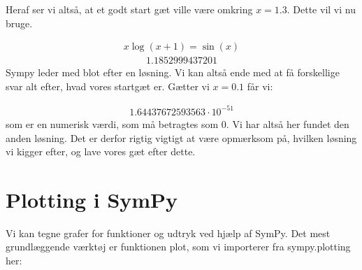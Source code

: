 \documentclass[letterpaper,10pt,english]{jupyterBook}
\begin{document}
Heraf ser vi altså, at et godt start gæt ville være omkring \(x=1.3\). Dette vil vi nu bruge.

\begin{sphinxVerbatim}[commandchars=\\\{\}]
       
  
\end{sphinxVerbatim}
\begin{equation*}
\begin{split}\displaystyle x \log{\left(x + 1 \right)} = \sin{\left(x \right)}\end{split}
\end{equation*}\begin{equation*}
\begin{split}\displaystyle 1.1852999437201\end{split}
\end{equation*}
Sympy leder med  blot efter en løsning. Vi kan altså ende med at få forskellige svar alt efter, hvad vores startgæt er. Gætter vi \(x = 0.1\) får vi:

\begin{sphinxVerbatim}[commandchars=\\\{\}]
  
\end{sphinxVerbatim}
\begin{equation*}
\begin{split}\displaystyle 1.64437672593563 \cdot 10^{-51}\end{split}
\end{equation*}
som er en numerisk værdi, som må betragtes som 0. Vi har altså her fundet den anden løsning. Det er derfor rigtig vigtigt at være opmærksom på, hvilken løsning vi kigger efter, og lave vores gæt efter dette.


\section{Plotting i SymPy}
\label{\detokenize{notebooks/sympy/Notebook3_plot:plotting-i-sympy}}\label{\detokenize{notebooks/sympy/Notebook3_plot::doc}}
Vi kan tegne grafer for funktioner og udtryk ved hjælp af SymPy. Det mest grundlæggende værktøj er funktionen plot, som vi importerer fra sympy.plotting her:
\end{document}
